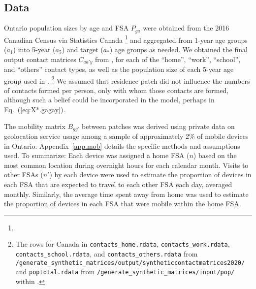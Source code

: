 \subsection{Data}\label{ex:data}
Ontario population sizes by age and FSA $P_{ga}$ were obtained from
the 2016 Canadian Census via Statistics Canada%
\footnote{}
and aggregated from 1-year age groups ($a_1$) into 5-year ($a_5$) and target ($a_*$) age groups as needed.
We obtained the final output contact matrices $C_{aa'y}$ from \cite{Prem2017},
for each of the ``home'', ``work'', ``school'', and ``others'' contact types,
as well as the population size of each 5-year age group used in \cite{Prem2017}.%
\footnote{\raggedright
  The rows for Canada in
  \texttt{contacts\_home.rdata},
  \texttt{contacts\_work.rdata},
  \texttt{contacts\_school.rdata}, and
  \texttt{contacts\_others.rdata}
  from \texttt{/generate\_synthetic\_matrices/output/syntheticcontactmatrices2020/} and
  \texttt{poptotal.rdata}
  from \texttt{/generate\_synthetic\_matrices/input/pop/}
  within .}
We assumed that residence patch did not influence the numbers of contacts formed per person,
only with whom those contacts are formed,
although such a belief could be incorporated in the model,
perhaps in Eq.~(\ref{eq:X*.gagay}).
\par
The mobility matrix $B_{gg'}$ between patches was derived using
private data on geolocation service usage among a sample of approximately 2\% of mobile devices in Ontario.
Appendix~\ref{app.mob} details the specific methods and assumptions used.
To summarize:
Each device was assigned a home FSA ($n$) based on
the most common location during overnight hours for each calendar month.
Visits to other FSAs ($n'$) by each device were used to estimate
the proportion of devices in each FSA that are expected to travel to each other FSA each day, averaged monthly.
Similarly, the average time spent away from home was used to estimate
the proportion of devices in each FSA that were mobile within the home FSA.
